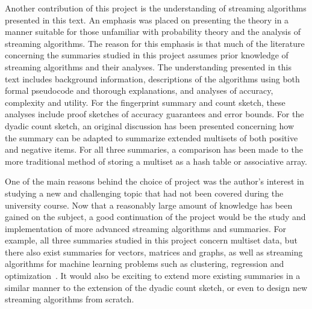 Another contribution of this project is the understanding of streaming algorithms presented in this text.
An emphasis was placed on presenting the theory in a manner suitable for those unfamiliar with probability theory and the analysis of streaming algorithms.
The reason for this emphasis is that much of the literature concerning the summaries studied in this project assumes prior knowledge of streaming algorithms and their analyses.
The understanding presented in this text includes background information, descriptions of the algorithms using both formal pseudocode and thorough explanations, and analyses of accuracy, complexity and utility.
For the fingerprint summary and count sketch, these analyses include proof sketches of accuracy guarantees and error bounds.
For the dyadic count sketch, an original discussion has been presented concerning how the summary can be adapted to summarize extended multisets of both positive and negative items.
For all three summaries, a comparison has been made to the more traditional method of storing a multiset as a hash table or associative array.

One of the main reasons behind the choice of project was the author's interest in studying a new and challenging topic that had not been covered during the university course.
Now that a reasonably large amount of knowledge has been gained on the subject, a good continuation of the project would be the study and implementation of more advanced streaming algorithms and summaries.
For example, all three summaries studied in this project concern multiset data, but there also exist summaries for vectors, matrices and graphs, as well as streaming algorithms for machine learning problems such as clustering, regression and optimization~\citep{cormode20}.
It would also be exciting to extend more existing summaries in a similar manner to the extension of the dyadic count sketch, or even to design new streaming algorithms from scratch.
